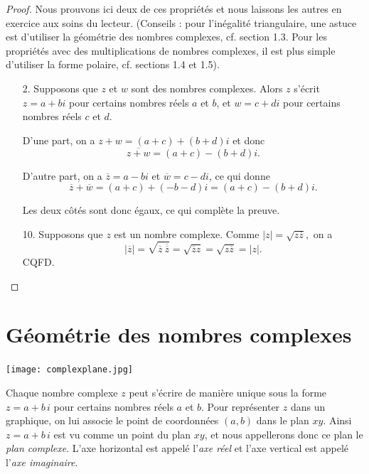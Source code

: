\begin{proof}
Nous prouvons ici deux de ces propriétés et nous laissons les autres en exercice aux soins du lecteur.
(Conseils : pour l'inégalité triangulaire, une astuce est d'utiliser la géométrie des nombres complexes, cf. section 1.3. Pour les propriétés avec des multiplications de nombres complexes, il est plus simple d'utiliser la forme polaire, cf. sections 1.4 et 1.5).

\begin{enumerate}
	\item[2.] Supposons que $z$ et $w$ sont des nombres complexes.
Alors $z$ s'écrit
$z = a+bi$ pour certains nombres réels $a$ et $b$, et $w = c+di$
pour certains nombres réels $c$ et $d$.

D'une part, on a $z+w = (a+c) + (b+d)i$ et donc $$\overline{z+w} = (a+c) - (b+d)i.$$

D'autre part, on a $\overline{z} = a-bi$ et $\overline{w} = c-di$, ce qui donne
$$\overline{z} + \overline{w} = (a+c)+(-b-d)i = (a+c)-(b+d)i.$$

Les deux côtés sont donc égaux, ce qui complète la preuve.


	\item[10.] Supposons que $z$ est un nombre complexe.  Comme
$
\vert z \vert = \sqrt{z \overline{z}},
$
on a
$$
\vert \overline{z} \vert = \sqrt{\overline{z} \ \overline{\overline{z}}}  = \sqrt{\overline{z} z }= \sqrt{ z \overline{z} }= \vert z \vert.
$$
CQFD.
\end{enumerate}
\end{proof}


\section{Géométrie des nombres complexes}

\begin{center}
\texttt{[image: complexplane.jpg]}~\\[1cm]
\end{center}
Chaque nombre complexe $z$
peut s'écrire de manière unique sous la forme $z=a+b\,i$ pour certains nombres réels $a$ et $b$. Pour représenter $z$ dans un graphique,
on lui associe le point de coordonnées $(a,b)$ dans le plan $xy$.
Ainsi $z=a+b\,i$ est vu comme un point du plan $xy$, et nous appellerons donc ce plan le \emph{plan complexe}.  L'axe horizontal est appelé
l'\emph{axe réel} et l'axe vertical
est appelé l'\emph{axe imaginaire}.




